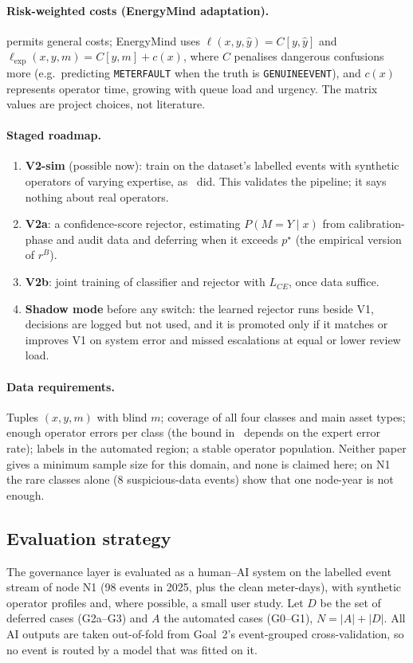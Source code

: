 \documentclass[11pt,a4paper]{article}
\renewcommand{\_}{\textunderscore\allowbreak}
\providecommand{\GE}{\texttt{GENUINE\_EVENT}}
\providecommand{\MF}{\texttt{METER\_FAULT}}
\newcommand{\lvl}[1]{\textsf{#1}}
\begin{document}
\paragraph{Risk-weighted costs (EnergyMind adaptation).} \cite{mozannar} permits general costs; EnergyMind
uses $\ell(x,y,\hat y)=C[y,\hat y]$ and $\ell_{\exp}(x,y,m)=C[y,m]+c(x)$, where $C$ penalises dangerous
confusions more (e.g.\ predicting \MF{} when the truth is \GE), and $c(x)$ represents operator time, growing with
queue load and urgency. The matrix values are project choices, not literature.

\paragraph{Staged roadmap.}
\begin{enumerate}[leftmargin=*,itemsep=1pt]
\item \textbf{V2-sim} (possible now): train on the dataset's labelled events with synthetic operators of varying
expertise, as~\cite{mozannar} did. This validates the pipeline; it says nothing about real operators.
\item \textbf{V2a}: a confidence-score rejector, estimating $P(M=Y\mid x)$ from calibration-phase and audit data
and deferring when it exceeds $p^\star$ (the empirical version of $r^B$).
\item \textbf{V2b}: joint training of classifier and rejector with $L_{CE}$, once data suffice.
\item \textbf{Shadow mode} before any switch: the learned rejector runs beside V1, decisions are logged but not
used, and it is promoted only if it matches or improves V1 on system error and missed escalations at equal or
lower review load.
\end{enumerate}

\paragraph{Data requirements.} Tuples $(x,y,m)$ with blind $m$; coverage of all four classes and main asset types;
enough operator errors per class (the bound in~\cite{mozannar} depends on the expert error rate); labels in the
automated region; a stable operator population. Neither paper gives a minimum sample size for this domain, and
none is claimed here; on N1 the rare classes alone (8 suspicious-data events) show that one node-year is not
enough.

\subsection{Evaluation strategy}
\label{sec:eval}
The governance layer is evaluated as a human--AI system on the labelled event stream of node N1 (98 events in
2025, plus the clean meter-days), with synthetic operator profiles and, where possible, a small user study.
Let $D$ be the set of deferred cases (\lvl{G2a}--\lvl{G3}) and $A$ the automated cases (\lvl{G0}--\lvl{G1}),
$N=|A|+|D|$. All AI outputs are taken out-of-fold from Goal~2's event-grouped cross-validation, so no event
is routed by a model that was fitted on it.
\end{document}
